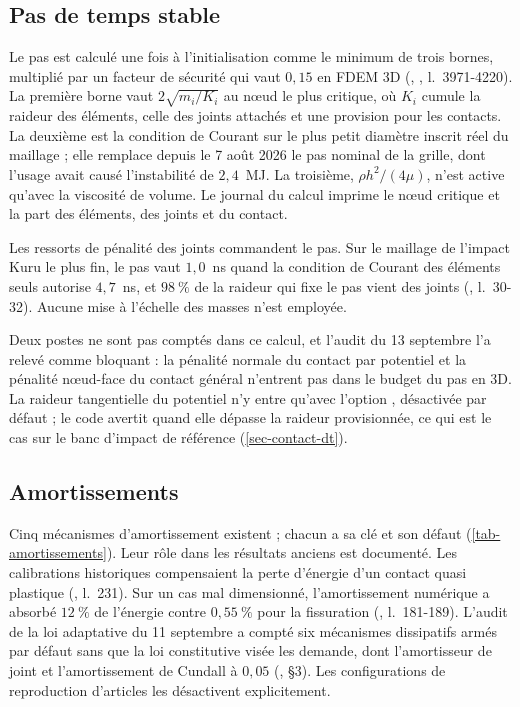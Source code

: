 \subsection{Pas de temps stable}
\label{sec-dt}

Le pas est calculé une fois à l'initialisation comme le minimum de trois bornes, multiplié par un facteur de sécurité  qui vaut $0{,}15$ en FDEM 3D (, , l.~3971-4220). La première borne vaut $2\sqrt{m_i/K_i}$ au nœud le plus critique, où $K_i$ cumule la raideur des éléments, celle des joints attachés et une provision pour les contacts. La deuxième est la condition de Courant sur le plus petit diamètre inscrit réel du maillage ; elle remplace depuis le 7 août 2026 le pas nominal de la grille, dont l'usage avait causé l'instabilité de $2{,}4$~MJ. La troisième, $\rho h^2/(4\mu)$, n'est active qu'avec la viscosité de volume. Le journal du calcul imprime le nœud critique et la part des éléments, des joints et du contact.

Les ressorts de pénalité des joints commandent le pas. Sur le maillage de l'impact Kuru le plus fin, le pas vaut $1{,}0$~ns quand la condition de Courant des éléments seuls autorise $4{,}7$~ns, et $98~\%$ de la raideur qui fixe le pas vient des joints (, l.~30-32). Aucune mise à l'échelle des masses n'est employée.

Deux postes ne sont pas comptés dans ce calcul, et l'audit du 13 septembre l'a relevé comme bloquant : la pénalité normale du contact par potentiel et la pénalité nœud-face du contact général n'entrent pas dans le budget du pas en 3D. La raideur tangentielle du potentiel n'y entre qu'avec l'option , désactivée par défaut ; le code avertit quand elle dépasse la raideur provisionnée, ce qui est le cas sur le banc d'impact de référence (\cref{sec-contact-dt}).

\subsection{Amortissements}

Cinq mécanismes d'amortissement existent ; chacun a sa clé et son défaut (\cref{tab-amortissements}). Leur rôle dans les résultats anciens est documenté. Les calibrations historiques compensaient la perte d'énergie d'un contact quasi plastique (, l.~231). Sur un cas mal dimensionné, l'amortissement numérique a absorbé $12~\%$ de l'énergie contre $0{,}55~\%$ pour la fissuration (, l.~181-189). L'audit de la loi adaptative du 11 septembre a compté six mécanismes dissipatifs armés par défaut sans que la loi constitutive visée les demande, dont l'amortisseur de joint et l'amortissement de Cundall à $0{,}05$ (, §3). Les configurations de reproduction d'articles les désactivent explicitement.

